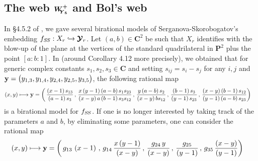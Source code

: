 \documentclass[11pt]{amsart}
\begin{document}
\subsection{\bf The web $\boldsymbol{W^{+}_{\hspace{-0.1cm} \boldsymbol{Y}_5}}$ and Bol's web}
In \S4.5.2 of 
\cite{PirioAFST},  
 we gave several birational models of Serganova-Skorobogatov's embedding 
$f_{S\hspace{-0.03cm}S}: X_r \hookrightarrow \boldsymbol{\mathcal Y}_r$.  Let $(a,b)\in \mathbf C^2$ be such that $X_r$ identifies with the blow-up of the plane at the vertices of the standard quadrilateral in $\mathbf P^2$ plus the point $[a:b:1]$. In 
\cite{PirioAFST} (around Corollary 4.12 more precisely), we 
 obtained that for generic complex constants $s_1,s_2,s_3\in \mathbf C$ and setting $s_{ij}=s_i-s_j$ for any $i,j$ and 
 $ \boldsymbol{\rm y}=\big(y_{1,3},y_{1,4}, y_{2,4}, y_{2,5}, y_{3,5}\big)$, the following rational map 
\begin{align*}
(x,y)& \longmapsto  \boldsymbol{\rm y}= 
\left(\, 
\frac{\left(x -1\right)  {s_{13}}}{\left(a -1\right)  {s_3}}
\, , \, \frac{x \left(y -1\right) \left(a -b \right)  {s_1}  {s_{23}}}{\left(x -y \right) a \left(b -1\right)  {s_3}  {s_{12}}}
\, , \, 
\frac{y \left(a -b \right)  {s_2}}{\left(x -y \right) b  {s_{12}}}
\, , \, 
\frac{\left(b -1\right)  {s_3}}{\left(y -1\right)  {s_{23}}}
\, , \, 
\frac{\left(x -y \right) \left(b -1\right)  {s_{12}}}{\left(y -1\right) \left(a -b \right)  {s_{23}}}
\right)
\end{align*}
is a birational model for $f_{S\hspace{-0.03cm}S}$.  If one is no longer interested by taking track of the parameters $a$ and $b$, by eliminating some parameters, one can consider the rational map 
%
%
%
%
\begin{align*}
(x,y)& \longmapsto  \boldsymbol{\rm y}= 
\left(\, 
g_{13}\,
\left(x -1\right) 
\, , \, 
g_{14}\,
\frac{ x \left(y -1\right)}{\left(x -y \right) }
\, , \, 
\frac{g_{24}\,y }{\left(x -y \right) }
\, , \, 
\frac{g_{25}}{\left(y -1\right) }
\, , \, 
g_{35}\,
\frac{\left(x -y \right) }{\left(y -1\right) }
\right)
\end{align*}
\end{document}

